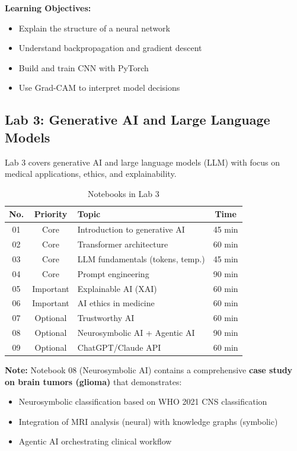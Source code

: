 \documentclass[11pt,a4paper]{article}
\begin{document}
\textbf{Learning Objectives:}
\begin{itemize}[nosep]
    \item Explain the structure of a neural network
    \item Understand backpropagation and gradient descent
    \item Build and train CNN with PyTorch
    \item Use Grad-CAM to interpret model decisions
\end{itemize}

\subsection{Lab 3: Generative AI and Large Language Models}

Lab 3 covers generative AI and large language models (LLM) with focus on medical applications, ethics, and explainability.

\begin{table}[htbp]
\centering
\caption{Notebooks in Lab 3}
\label{tab:lab3}
\begin{tabular}{@{}ccp{6cm}c@{}}
\toprule
\textbf{No.} & \textbf{Priority} & \textbf{Topic} & \textbf{Time} \\
\midrule
01 & \textcolor{corecolor}{Core} & Introduction to generative AI & 45 min \\
02 & \textcolor{corecolor}{Core} & Transformer architecture & 60 min \\
03 & \textcolor{corecolor}{Core} & LLM fundamentals (tokens, temp.) & 45 min \\
04 & \textcolor{corecolor}{Core} & Prompt engineering & 90 min \\
\midrule
05 & \textcolor{recommendedcolor}{Important} & Explainable AI (XAI) & 60 min \\
06 & \textcolor{recommendedcolor}{Important} & AI ethics in medicine & 60 min \\
\midrule
07 & \textcolor{optionalcolor}{Optional} & Trustworthy AI & 60 min \\
08 & \textcolor{optionalcolor}{Optional} & Neurosymbolic AI + Agentic AI & 90 min \\
09 & \textcolor{optionalcolor}{Optional} & ChatGPT/Claude API & 60 min \\
\bottomrule
\end{tabular}
\end{table}

\textbf{Note:} Notebook 08 (Neurosymbolic AI) contains a comprehensive \textbf{case study on brain tumors (glioma)} that demonstrates:
\begin{itemize}[nosep]
    \item Neurosymbolic classification based on WHO 2021 CNS classification
    \item Integration of MRI analysis (neural) with knowledge graphs (symbolic)
    \item Agentic AI orchestrating clinical workflow
\end{itemize}
\end{document}
